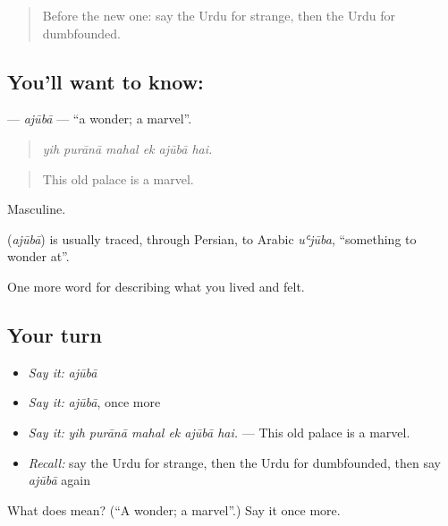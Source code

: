 \begin{quote}
Before the new one: say the Urdu for strange, then the Urdu for dumbfounded.
\end{quote}

\subsection*{You'll want to know: }
\textbf{} — \emph{ajūbā} — \textquotedblleft{}a wonder; a marvel\textquotedblright{}.

\begin{quote}
     
\end{quote}

\begin{quote}
\emph{yih purānā mahal ek ajūbā hai.}
\end{quote}

\begin{quote}
This old palace is a marvel.
\end{quote}

Masculine.

\begin{cousinweb}
\textbf{} (\emph{ajūbā}) is usually traced, through Persian, to Arabic \emph{uʿjūba}, \textquotedblleft{}something to wonder at\textquotedblright{}.
\end{cousinweb}

\begin{grammarlens}[title={What you've built}]
One more word for describing what you lived and felt.
\end{grammarlens}

\subsection*{Your turn}
\begin{itemize}
\raggedright
  \item \emph{Say it:} \emph{ajūbā}
  \item \emph{Say it:} \emph{ajūbā}, once more
  \item \emph{Say it:} \emph{yih purānā mahal ek ajūbā hai.} — This old palace is a marvel.
  \item \emph{Recall:} say the Urdu for strange, then the Urdu for dumbfounded, then say \emph{ajūbā} again
\end{itemize}

\begin{tcolorbox}[breakable,colback=teal!4,colframe=teal!35!black,title={Before you move on}]
What does  mean? (\textquotedblleft{}A wonder; a marvel\textquotedblright{}.) Say it once more.
\end{tcolorbox}
